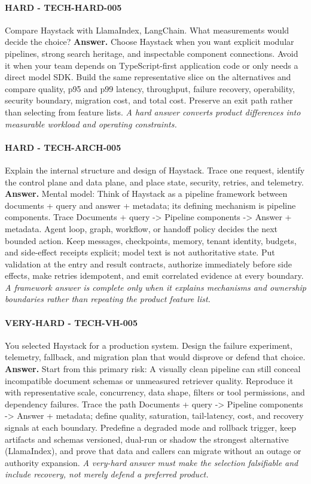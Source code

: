 \paragraph{HARD - TECH-HARD-005} Compare Haystack with LlamaIndex, LangChain. What measurements would decide the choice?
\textbf{Answer.} Choose Haystack when you want explicit modular pipelines, strong search heritage, and inspectable component connections. Avoid it when your team depends on TypeScript-first application code or only needs a direct model SDK. Build the same representative slice on the alternatives and compare quality, p95 and p99 latency, throughput, failure recovery, operability, security boundary, migration cost, and total cost. Preserve an exit path rather than selecting from feature lists.
\textit{A hard answer converts product differences into measurable workload and operating constraints.}
\paragraph{HARD - TECH-ARCH-005} Explain the internal structure and design of Haystack. Trace one request, identify the control plane and data plane, and place state, security, retries, and telemetry.
\textbf{Answer.} Mental model: Think of Haystack as a pipeline framework between documents + query and answer + metadata; its defining mechanism is pipeline components. Trace Documents + query -> Pipeline components -> Answer + metadata. Agent loop, graph, workflow, or handoff policy decides the next bounded action. Keep messages, checkpoints, memory, tenant identity, budgets, and side-effect receipts explicit; model text is not authoritative state. Put validation at the entry and result contracts, authorize immediately before side effects, make retries idempotent, and emit correlated evidence at every boundary.
\textit{A framework answer is complete only when it explains mechanisms and ownership boundaries rather than repeating the product feature list.}
\paragraph{VERY-HARD - TECH-VH-005} You selected Haystack for a production system. Design the failure experiment, telemetry, fallback, and migration plan that would disprove or defend that choice.
\textbf{Answer.} Start from this primary risk: A visually clean pipeline can still conceal incompatible document schemas or unmeasured retriever quality. Reproduce it with representative scale, concurrency, data shape, filters or tool permissions, and dependency failures. Trace the path Documents + query -> Pipeline components -> Answer + metadata; define quality, saturation, tail-latency, cost, and recovery signals at each boundary. Predefine a degraded mode and rollback trigger, keep artifacts and schemas versioned, dual-run or shadow the strongest alternative (LlamaIndex), and prove that data and callers can migrate without an outage or authority expansion.
\textit{A very-hard answer must make the selection falsifiable and include recovery, not merely defend a preferred product.}
